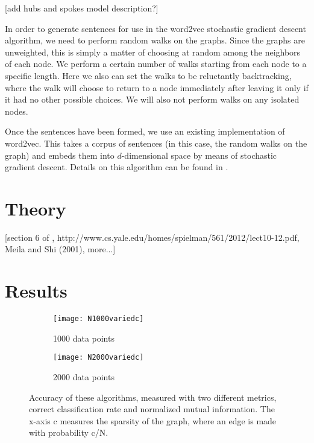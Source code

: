 \documentclass{article}
\begin{document}
[add hubs and spokes model description?]

In order to generate sentences for use in the word2vec stochastic gradient descent algorithm, we need to perform random walks on the graphs. Since the graphs are unweighted, this is simply a matter of choosing at random among the neighbors of each node. We perform a certain number of walks starting from each node to a specific length. Here we also can set the walks to be reluctantly backtracking, where the walk will choose to return to a node immediately after leaving it only if it had no other possible choices. We will also not perform walks on any isolated nodes.

Once the sentences have been formed, we use an existing implementation of word2vec\cite{word2vec}. This takes a corpus of sentences (in this case, the random walks on the graph) and embeds them into $d$-dimensional space by means of stochastic gradient descent. Details on this algorithm can be found in \cite{word2vec}.

\section{Theory}

[section 6 of \cite{Luxburg}, http://www.cs.yale.edu/homes/spielman/561/2012/lect10-12.pdf, Meila and Shi (2001), more...]

\section{Results}

\begin{figure}[h]
 
\begin{subfigure}{0.5\textwidth}
\texttt{[image: N1000variedc]} 
\caption{1000 data points}
\label{fig:subim1}
\end{subfigure}
\begin{subfigure}{0.5\textwidth}
\texttt{[image: N2000variedc]}
\caption{2000 data points}
\label{fig:subim2}
\end{subfigure}
\caption{Accuracy of these algorithms, measured with two different metrics, correct classification rate and normalized mutual information. The x-axis c measures the sparsity of the graph, where an edge is made with probability c/N.}
\label{fig:image2}
\end{figure}

\printbibliography
\end{document}
